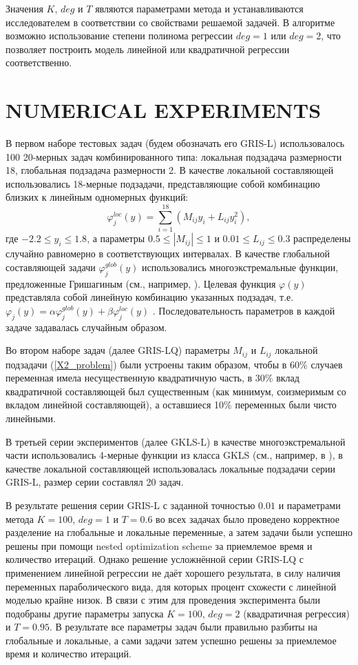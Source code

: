 \documentclass{aip-cp}
\begin{document}
Значения  $K$, $deg$ и $T$ являются параметрами метода и устанавливаются исследователем в соответствии со свойствами решаемой задачей. В алгоритме возможно использование степени полинома регрессии $deg = 1$ или $deg = 2$, что позволяет построить модель линейной или квадратичной регрессии соответственно.

\section{NUMERICAL EXPERIMENTS}

В первом наборе тестовых задач (будем обозначать его GRIS-L) использовалось 100 20-мерных задач комбинированного типа: локальная подзадача размерности 18, глобальная подзадача размерности 2. В качестве локальной составляющей использовались 18-мерные подзадачи, представляющие собой комбинацию близких к линейным одномерных функций:
\begin{equation}\label{X2_problem}
\varphi_j^{loc}(y) = \sum_{i=1}^{18} \left(M_{ij} y_i + L_{ij} y_i^2\right) ,
\end{equation}
где $-2.2 \leq y_i \leq 1.8$, а параметры $0.5 \leq |M_{ij}| \leq 1$ и $0.01 \leq L_{ij} \leq 0.3$  распределены случайно равномерно в соответствующих интервалах.
В качестве глобальной составляющей задачи $\varphi_j^{glob}(y)$ использовались многоэкстремальные функции, предложенные Гришагиным (см., например, \cite{Grishagin1994}).
Целевая функция $\varphi(y)$  представляла собой линейную комбинацию указанных подзадач, т.е. $\varphi_j(y) = \alpha \varphi_j^{glob}(y) + \beta \varphi_j^{loc}(y)$ . Последовательность параметров в каждой задаче задавалась случайным образом. 

Во втором наборе задач (далее GRIS-LQ) параметры $M_{ij}$ и $L_{ij}$ локальной подзадачи (\ref{X2_problem}) были устроены таким образом, чтобы в 60\% случаев переменная имела несущественную квадратичную часть, в 30\% вклад квадратичной составляющей был существенным (как минимум, соизмеримым со вкладом линейной составляющей), а оставшиеся 10\% переменных были чисто линейными.

В третьей серии экспериментов (далее GKLS-L) в качестве многоэкстремальной части использовались 4-мерные функции из класса GKLS (см., например, в \cite{Sergeyev2015,Grishagin2018}), в качестве локальной составляющей использовалась локальные подзадачи серии GRIS-L, размер серии составлял 20 задач.

В результате решения серии GRIS-L с заданной точностью $0.01$ и параметрами метода $K=100$, $deg=1$ и $T=0.6$ во всех задачах было проведено корректное разделение на глобальные и локальные переменные, а затем задачи были успешно решены при помощи nested optimization scheme за приемлемое время и количество итераций. Однако решение усложнённой серии GRIS-LQ с применением линейной регрессии не даёт хорошего результата, в силу наличия переменных параболического вида, для которых процент схожести с линейной моделью крайне низок. В связи с этим для проведения эксперимента были подобраны другие параметры запуска $K=100$, $deg=2$ (квадратичная регрессия) и $T=0.95$. В результате все параметры задач были правильно разбиты на глобальные и локальные, а сами задачи затем успешно решены за приемлемое время и количество итераций.
 
\end{document}
